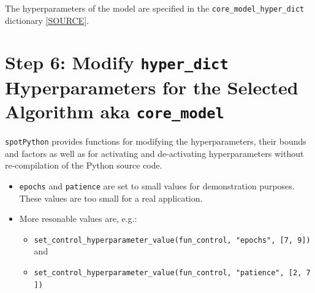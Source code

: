 \documentclass[
  letterpaper,
  DIV=11,
  numbers=noendperiod]{scrreprt}
\providecommand{\tightlist}{%
  \setlength{\itemsep}{0pt}\setlength{\parskip}{0pt}}\usepackage{longtable,booktabs,array}
\begin{document}
The hyperparameters of the model are specified in the
\texttt{core\_model\_hyper\_dict} dictionary
\href{https://github.com/sequential-parameter-optimization/spotPython/blob/main/src/spotPython/hyperdict/light_hyper_dict.json}{{[}SOURCE{]}}.

\section{\texorpdfstring{Step 6: Modify \texttt{hyper\_dict}
Hyperparameters for the Selected Algorithm aka
\texttt{core\_model}}{Step 6: Modify hyper\_dict Hyperparameters for the Selected Algorithm aka core\_model}}\label{sec-modification-of-hyperparameters-33}

\texttt{spotPython} provides functions for modifying the
hyperparameters, their bounds and factors as well as for activating and
de-activating hyperparameters without re-compilation of the Python
source code.

\begin{tcolorbox}[enhanced jigsaw, rightrule=.15mm, coltitle=black, title=\textcolor{quarto-callout-caution-color}{\faFire}\hspace{0.5em}{Caution: Small number of epochs for demonstration purposes}, opacitybacktitle=0.6, bottomrule=.15mm, opacityback=0, left=2mm, colback=white, leftrule=.75mm, colframe=quarto-callout-caution-color-frame, colbacktitle=quarto-callout-caution-color!10!white, toprule=.15mm, toptitle=1mm, bottomtitle=1mm, titlerule=0mm, breakable, arc=.35mm]

\begin{itemize}
\tightlist
\item
  \texttt{epochs} and \texttt{patience} are set to small values for
  demonstration purposes. These values are too small for a real
  application.
\item
  More resonable values are, e.g.:

  \begin{itemize}
  \tightlist
  \item
    \texttt{set\_control\_hyperparameter\_value(fun\_control,\ "epochs",\ {[}7,\ 9{]})}
    and
  \item
    \texttt{set\_control\_hyperparameter\_value(fun\_control,\ "patience",\ {[}2,\ 7{]})}
  \end{itemize}
\end{itemize}

\end{tcolorbox}
\end{document}
